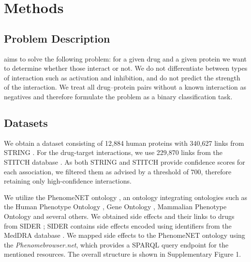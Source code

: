 \documentclass{bioinfo}
\renewcommand{\cite}{\citep}
\begin{document}



\enlargethispage{12pt}

\section{Methods}
\subsection{Problem Description}
\name{} aims to solve the following problem: for a given drug and a
given protein we want to determine whether those interact or not.  We
do not differentiate between types of interaction such as activation
and inhibition, and do not predict the strength of the interaction.
We treat all drug--protein pairs without a known interaction as
negatives and therefore formulate the problem as a binary
classification task.

\subsection{Datasets}
We obtain a dataset consisting of 12,884 human proteins with 
340,627 links from STRING \citep{STRINGv10}. For the drug-target
interactions, we use 229,870 links from the STITCH database
\citep{STITCHv5}. As both STRING and STITCH provide confidence scores
for each association, we filtered them as advised by a threshold of
$700$, therefore retaining only high-confidence interactions.

We utilize the PhenomeNET ontology \citep{PhenomeNET2011}, an ontology
integrating ontologies such as the Human Phenotype Ontology
\citep{HPO2018}, Gene Ontology \cite{GOoriginal2000, GOrecent2020},
Mammalian Phenotype Ontology \citep{MP2009} and several others.  We
obtained side effects and their links to drugs from SIDER
\citep{SIDER}; SIDER contains side effects encoded using identifiers
from the MedDRA database \citep{MedDRA}. We mapped side effects to the
PhenomeNET ontology using the \textit{Phenomebrowser.net}, which
provides a SPARQL query endpoint for the mentioned resources. The
overall structure is shown in Supplementary Figure 1.
\end{document}
